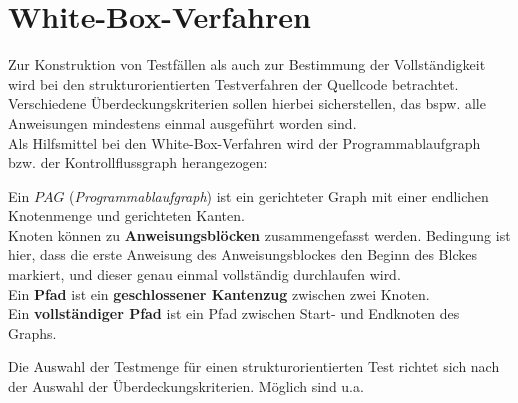 \section{White-Box-Verfahren}

Zur Konstruktion von Testfällen als auch zur Bestimmung der Vollständigkeit wird bei den strukturorientierten Testverfahren der Quellcode betrachtet.\\
Verschiedene Überdeckungskriterien sollen hierbei sicherstellen, das bspw. alle Anweisungen mindestens einmal ausgeführt worden sind.\\

\noindent
Als Hilfsmittel bei den White-Box-Verfahren wird der Programmablaufgraph bzw. der Kontrollflussgraph herangezogen:

\vspace{5mm}
\begin{tcolorbox}[title={Programmablaufgraph}]
    Ein $PAG$ (\textit{Programmablaufgraph}) ist ein gerichteter Graph mit einer endlichen Knotenmenge und gerichteten Kanten.\\

    \noindent
    Knoten können zu \textbf{Anweisungsblöcken} zusammengefasst werden.
    Bedingung ist hier, dass die erste Anweisung des Anweisungsblockes den Beginn des Blckes markiert, und dieser genau einmal vollständig durchlaufen wird.\\

    \noindent
    Ein \textbf{Pfad} ist ein \textbf{geschlossener Kantenzug} zwischen zwei Knoten.\\

    \noindent
    Ein \textbf{vollständiger Pfad} ist ein Pfad zwischen Start- und Endknoten des Graphs.
\end{tcolorbox}
\vspace{5mm}

\noindent
Die Auswahl der Testmenge für einen strukturorientierten Test richtet sich nach der Auswahl der Überdeckungskriterien.
Möglich sind u.a.

